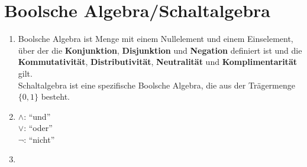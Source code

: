 \documentclass{gadsescript}
\begin{document}
\maketitle

\section{Boolsche Algebra/Schaltalgebra}
\begin{enumerate}[label=\alph*)]
	\item Boolsche Algebra ist Menge mit einem Nullelement und einem Einselement, über der die \textbf{Konjunktion}, \textbf{Disjunktion} und \textbf{Negation} definiert ist und die \textbf{Kommutativität}, \textbf{Distributivität}, \textbf{Neutralität} und \textbf{Komplimentarität} gilt.\\
		Schaltalgebra ist eine spezifische Boolsche Algebra, die aus der Trägermenge $ \{ 0, 1 \} $ besteht.
	\item $\wedge$: ``und''\\
		$\vee$: ``oder''\\
		$\neg$: ``nicht''\\
	\item ~
\end{enumerate}
\end{document}
